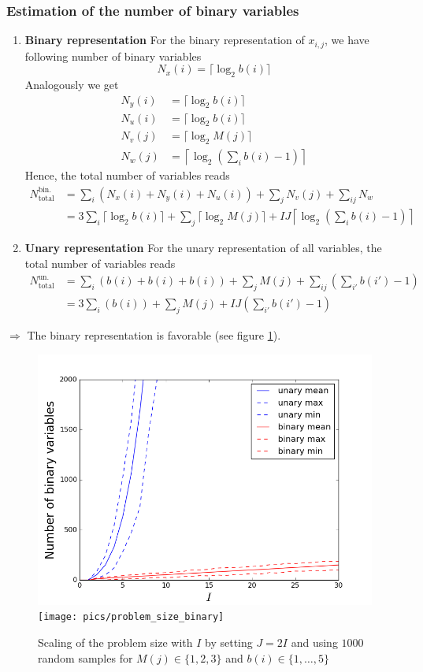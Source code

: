 \documentclass{article}
\begin{document}
\subsubsection{Estimation of the number of binary variables}
\begin{enumerate}
    \item \textbf{Binary representation}
    For the binary representation of $x_{i, j}$, we have following number of binary variables
    \begin{equation*}
        N_x(i) = \lceil \log_2 b(i) \rceil 
    \end{equation*}
    Analogously we get 
    \begin{align*}
        N_y(i) &= \lceil \log_2 b(i) \rceil \\
        N_u(i) &= \lceil \log_2 b(i) \rceil \\
        N_v(j) &= \lceil \log_2 M(j) \rceil \\
        N_w(j) &= \left \lceil \log_2\left(\sum_i b(i) - 1\right) \right \rceil 
    \end{align*}
    Hence, the total number of variables reads
    \begin{align*}
        N_\text{total}^\text{bin. rep.} & = \sum_i \left( N_x(i) + N_y(i) + N_u(i) \right) + \sum_j N_v(j) + \sum_{ij} N_w \\
                                        & = 3 \sum_i \lceil \log_2 b(i) \rceil + \sum_j \lceil \log_2 M(j) \rceil+ I J \left \lceil \log_2 \left( \sum_i b(i) - 1 \right) \right \rceil 
    \end{align*}
    \item \textbf{Unary representation}
    For the unary representation of all variables, the total number of variables reads
    \begin{align*}
        N_\text{total}^\text{un. rep.} & = \sum_i \left( b(i) + b(i) + b(i)\right) + \sum_j M(j) + \sum_{ij} \left(\sum_{i'} b(i') - 1\right) \\
                                       & = 3 \sum_i \left(b(i)\right) + \sum_j M(j) + I J \left(\sum_{i'} b(i') - 1\right)
    \end{align*}
\end{enumerate}
$\Rightarrow$ The binary representation is favorable (see figure \ref{fig:problem_size}).
\begin{figure}[htpb]
    \centering
    \includegraphics[width=0.4\linewidth]{pics/problem_size}
    \texttt{[image: pics/problem\_size\_binary]}
    \caption{Scaling of the problem size with $I$ by setting $J=2I$ and using $1000$ random samples for $M(j)\in\{1,2,3\}$ and $b(i)\in\{1,\dots, 5\}$}
    \label{fig:problem_size}
\end{figure}
\end{document}
